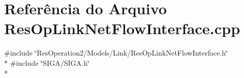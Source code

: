 \section{Referência do Arquivo Res\+Op\+Link\+Net\+Flow\+Interface.\+cpp}
\label{_res_op_link_net_flow_interface_8cpp}
{\ttfamily \#include \char`\"{}Res\+Operation2/\+Models/\+Link/\+Res\+Op\+Link\+Net\+Flow\+Interface.\+h\char`\"{}}\\*
{\ttfamily \#include \char`\"{}S\+I\+G\+A/\+S\+I\+G\+A.\+h\char`\"{}}\\*
